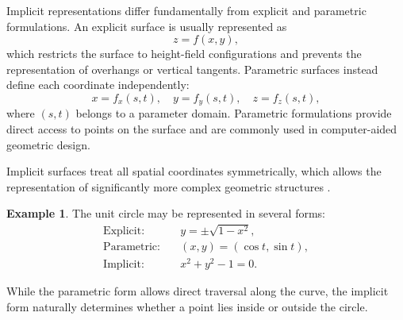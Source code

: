 \documentclass[12pt, a4paper, oneside]{book}
\theoremstyle{plain}
\theoremstyle{definition}
\newtheorem{example}[theorem]{Example}
\theoremstyle{remark}
\theoremstyle{definition}
\begin{document}
\begin{center}
\end{center}

Implicit representations differ fundamentally from explicit and parametric formulations. An explicit surface is usually represented as
\[
z=f(x,y),
\]
which restricts the surface to height-field configurations and prevents the representation of overhangs or vertical tangents. Parametric surfaces instead define each coordinate independently:
\[
x=f_x(s,t), \quad y=f_y(s,t), \quad z=f_z(s,t),
\]
where $(s,t)$ belongs to a parameter domain. Parametric formulations provide direct access to points on the surface and are commonly used in computer-aided geometric design.

Implicit surfaces treat all spatial coordinates symmetrically, which allows the representation of significantly more complex geometric structures \cite{bloomenthal2000implicit}.

\begin{example}
The unit circle may be represented in several forms:
\begin{align*}
\text{Explicit:} \quad & y=\pm\sqrt{1-x^2},\\
\text{Parametric:} \quad & (x,y)=(\cos t,\sin t),\\
\text{Implicit:} \quad & x^2+y^2-1=0.
\end{align*}

While the parametric form allows direct traversal along the curve, the implicit form naturally determines whether a point lies inside or outside the circle.
\end{example}
\end{document}
